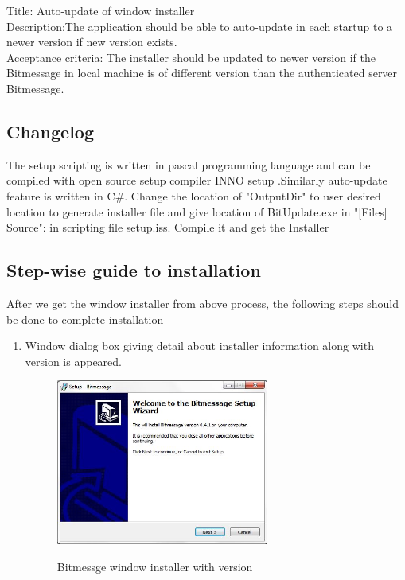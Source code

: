 \documentclass[12pt]{article}
\begin{document}
\begin{enumerate}
Title: Auto-update of window installer \\
Description:The application should be able to auto-update in each startup to a newer version if new version exists.\\
Acceptance criteria:
The installer should be updated to newer version if the Bitmessage in local machine is of different version than the authenticated server Bitmessage.\\

\subsection{Changelog}
The setup scripting is written in pascal programming language and can be compiled with open source setup compiler INNO setup .Similarly auto-update feature is written in C\#. Change the location of "OutputDir" to user desired location to generate installer file and give location of BitUpdate.exe in "[Files] Source": in scripting file setup.iss. Compile it and get the Installer



\subsection{Step-wise guide to installation}
After we get the window installer from above process, the following steps should be done to complete installation
\begin{enumerate}

\item Window dialog box giving detail about installer information along with version is appeared.\\
\begin{figure}[H]
\begin{center}
    {\label{fig:1} \includegraphics[width=7cm, keepaspectratio]{SE.jpg}}   
  \centering  \caption{Bitmessge window installer with version}
  \end{center}
\end{figure}


\end{enumerate}
\end{enumerate}
\end{document}
